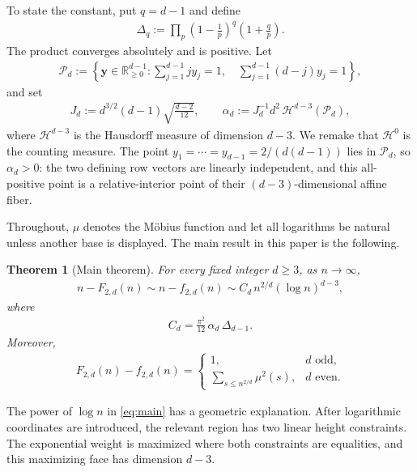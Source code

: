 \documentclass[12pt,a4paper,reqno]{amsart}
\numberwithin{equation}{section}
\newcommand{\R}{\mathbb R}
\newcommand{\cH}{\mathcal H}
\newcommand{\cP}{\mathcal P}
\newcommand{\1}{\mathbf 1}
\newcommand{\bsy}{\boldsymbol y}
\theoremstyle{plain}
\newtheorem{theorem}{Theorem}[section]
\theoremstyle{definition}
\begin{document}
To state the constant, put $q=d-1$ and define
\begin{align}
 \Delta_q:=\prod_p\left(1-\frac1p\right)^q
                  \left(1+\frac qp\right).
 \label{eq:Delta}
\end{align}
The product converges absolutely and is positive.  Let
\begin{align}
 \cP_d:=\left\{\bsy\in\R_{\geq0}^{d-1}:
 \sum_{j=1}^{d-1}j y_j=1,
 \quad
 \sum_{j=1}^{d-1}(d-j)y_j=1
 \right\},
\label{eq:polytope}
\end{align}
and set
\begin{align}
 J_d:=d^{3/2}(d-1)\sqrt{\frac{d-2}{12}},
 \qquad
 \alpha_d:=J_d^{-1}d^2\,
 \cH^{d-3}(\cP_d),
\label{eq:alpha}
\end{align}
where $\cH^{d-3}$ is the Hausdorff measure of dimension $d-3$. We remake that $\cH^0$ is the counting measure.  The point
$y_1=\cdots=y_{d-1}=2/(d(d-1))$ lies in $\cP_d$, so
$\alpha_d>0$: the two defining row vectors are linearly independent,
and this all-positive point is a relative-interior point of their
$(d-3)$-dimensional affine fiber.

Throughout, $\mu$ denotes the M\"obius function and let all logarithms be natural unless
another base is displayed. The main result in this paper is the following.

\begin{theorem}[Main theorem]\label{thm:main}
For every fixed integer $d\geq3$, as $n\to\infty$,
\begin{align}
 n-F_{2,d}(n)\sim n-f_{2,d}(n)
 \sim C_d\, n^{2/d}(\log n)^{d-3},
\label{eq:main}
\end{align}
where
\begin{align}
 C_d=\frac{\pi^2}{12}\,\alpha_d\,\Delta_{d-1}.
\label{eq:Cd}
\end{align}
Moreover,
\begin{align}
 F_{2,d}(n)-f_{2,d}(n)=
 \begin{cases}
 1,&d\text{ odd},\\[2mm]
 \displaystyle\sum_{s\leq n^{2/d}}\mu^2(s),&d\text{ even}.
 \end{cases}
\label{eq:exactdifference}
\end{align}
\end{theorem}

The power of $\log n$ in \eqref{eq:main} has a geometric explanation.
After logarithmic coordinates are introduced, the relevant region has
two linear height constraints.  The exponential weight is maximized
where both constraints are equalities, and this maximizing face has
dimension $d-3$.
\end{document}
